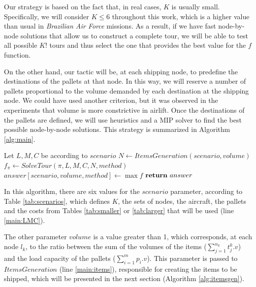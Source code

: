 \documentclass[preprint,authoryear]{elsarticle}
\begin{document}
Our strategy is based on the fact that, in real cases, $K$\/ is usually small. Specifically, we will consider $K \leq 6$\/ throughout this work, which is a higher value than usual in {\it Brazilian Air Force} missions. As a result, if we have fast node-by-node solutions that allow us to construct a complete tour, we will be able to test all possible $K!$\/ tours and thus select the one that provides the best value for the $f$\/ function.

On the other hand, our tactic will be, at each shipping node, to predefine the destinations of the pallets at that node. In this way, we will reserve a number of pallets proportional to the volume demanded by each destination at the shipping node. We could have used another criterion, but it was observed in the experiments that volume is more constrictive in airlift. Once the destinations of the pallets are defined, we will use heuristics and a MIP solver to find the best possible node-by-node solutions. This strategy is summarized in Algorithm \ref{alg:main}.


\begin{algorithm}[H]
	\caption{$ACLP+RPDP (scenario,volume)$}  \label{alg:main}
	\begin{algorithmic}[1]
		\State Let $L, M, C$ be according to $scenario$ \label{main:LMC}
		\State $N \gets ItemsGeneration(scenario,volume)$ \label{main:items}
			 \label{main:loop1}
				\State $f_{\pi} \gets SolveTour(\pi, L, M, C, N, method )$ \label{main:method}
			\EndFor \label{main:loop2}
			\State $answer[scenario,volume,method] \gets \max f$ \label{main:f}
		\EndFor
		\State $ {\bf return}\ answer$
	\end{algorithmic}
\end{algorithm}


In this algorithm, there are six values for the $scenario$\/ parameter, according to Table \ref{tab:scenarios}, which defines $K$, the sets of nodes, the aircraft, the pallets and the costs from Tables \ref{tab:smaller} or \ref{tab:larger} that will be used (line \ref{main:LMC}).


The other parameter $volume$\/ is a value greater than 1, which corresponds, at each node $l_k$, to the ratio between the sum of the volumes of the items ($\sum_{j=1}^{n_k} t^k_j.v$) and the load capacity of the pallets ($\sum_{i=1}^{m} p_i.v$). This parameter is passed to $ItemsGeneration$\/ (line \ref{main:items}), responsible for creating the items to be shipped, which will be presented in the next section (Algorithm \ref{alg:itemsgen}).
\end{document}

